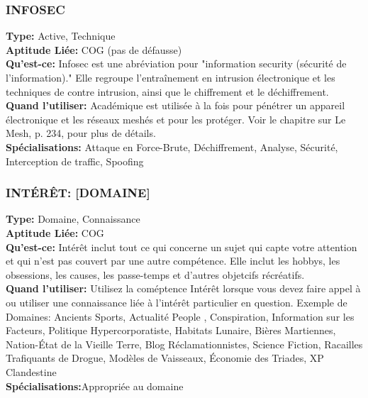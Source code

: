 \subsubsection{INFOSEC} \textbf{Type:} Active, Technique\\ \textbf{Aptitude Liée:} COG (pas de défausse) \\ \textbf{Qu'est-ce:} Infosec est une abréviation pour "information security (sécurité de l'information)." Elle regroupe l'entraînement en intrusion électronique et les techniques de contre intrusion, ainsi que le chiffrement et le déchiffrement. \\ \textbf{Quand l'utiliser:} Académique est utilisée à la fois pour pénétrer un appareil électronique et les réseaux meshés et pour les protéger. Voir le chapitre sur Le Mesh, p. 234, pour plus de détails. \\ \textbf{Spécialisations:} Attaque en Force-Brute, Déchiffrement, Analyse, Sécurité, Interception de traffic, Spoofing 

\subsubsection{INTÉRÊT: [DOMAINE]} \textbf{Type:} Domaine, Connaissance\\ \textbf{Aptitude Liée:} COG \\ \textbf{Qu'est-ce:} Intérêt inclut tout ce qui concerne un sujet qui capte votre attention et qui n'est pas couvert par une autre compétence. Elle inclut les hobbys, les obsessions, les causes, les passe-temps et d'autres objetcifs récréatifs. \\ \textbf{Quand l'utiliser:} Utilisez la coméptence Intérêt lorsque vous devez faire appel à ou utiliser une connaissance liée à l'intérêt particulier en question. Exemple de Domaines: Ancients Sports,  Actualité People , Conspiration, Information sur les Facteurs, Politique Hypercorporatiste, Habitats Lunaire, Bières Martiennes, Nation-État de la Vieille Terre, Blog Réclamationnistes, Science Fiction, Racailles Trafiquants de Drogue, Modèles de Vaisseaux, Économie des Triades, XP Clandestine\\ \textbf{Spécialisations:}Appropriée au domaine 

